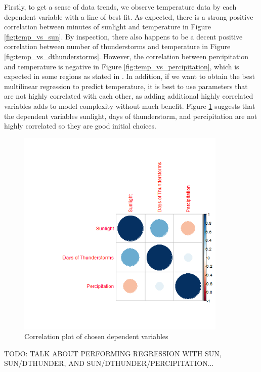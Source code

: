 Firstly, to get a sense of data trends, we observe temperature data by each dependent variable with a line of best fit. As expected, there is a strong positive correlation between minutes of sunlight and temperature in Figure \ref{fig:temp_vs_sun}. By inspection, there also happens to be a decent positive correlation between number of thunderstorms and temperature in Figure \ref{fig:temp_vs_dthunderstorms}. However, the correlation between percipitation and temperature is negative in Figure \ref{fig:temp_vs_percipitation}, which is expected in some regions as stated in \cite{epa_utah}. In addition, if we want to obtain the best multilinear regression to predict temperature, it is best to use parameters that are not highly correlated with each other, as adding additional highly correlated variables adds to model complexity without much benefit. Figure \ref{fig:correlation_plot} suggests that the dependent variables sunlight, days of thunderstorm, and percipitation are not highly correlated so they are good initial choices.

\begin{figure}
  \centering
  \includegraphics[width=10cm]{../data/img/correlation_plot.PNG}
  \caption{Correlation plot of chosen dependent variables}
  \label{fig:correlation_plot}
\end{figure}

TODO: TALK ABOUT PERFORMING REGRESSION WITH SUN, SUN/DTHUNDER, AND SUN/DTHUNDER/PERCIPITATION... 

\begin{table}[ht]
 \begin{centering}
 \caption{Temperature Difference Statistics}
 \label{tab:temp_diffs}
 \end{centering}
\end{table}

